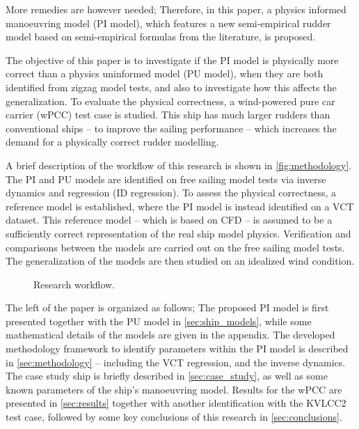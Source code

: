 More remedies are however needed; Therefore, in this paper, a physics informed manoeuvring model (PI model), which features a new semi-empirical rudder model based on semi-empirical formulas from the literature, is proposed.

The objective of this paper is to investigate if the PI model is physically more correct than a physics uninformed model (PU model), when they are both identified from zigzag model tests, and also to investigate how this affects the generalization.
To evaluate the physical correctness, a wind-powered pure car carrier (wPCC) test case is studied. 
This ship has much larger rudders than conventional ships -- to improve the sailing performance -- 
which increases the demand for a physically correct rudder modelling.

A brief description of the workflow of this research is shown in \autoref{fig:methodology}.
The PI and PU models are identified on free sailing model tests \citep{alexandersson_wpcc_2024} via inverse dynamics \citep{faber_inverse_2018} and regression (ID regression). To assess the physical correctness, a reference model is established, where the PI model is instead identified on a VCT dataset. This reference model -- which is based on CFD -- is assumed to be a sufficiently correct representation of the real ship model physics.
Verification and comparisons between the models are carried out on the free sailing model tests. The generalization of the models are then studied on an idealized wind condition.
%
\begin{figure}[h]
  \centering
  
  \caption{Research workflow.}
  \label{fig:methodology}
\end{figure}

The left of the paper is organized as follows; The proposed PI model is first presented together with the PU 
 model in \autoref{sec:ship_models}, while some mathematical details of the models are given in the appendix. 
The developed methodology framework to identify parameters within the PI model is described in \autoref{sec:methodology} -- including the VCT regression, and the inverse dynamics. The case study ship is briefly described in \autoref{sec:case_study}, as well as some known parameters of the ship's manoeuvring model. Results for the wPCC are presented in \autoref{sec:results} together with another identification with the KVLCC2 test case, followed by some key conclusions of this research in \autoref{sec:conclusions}.